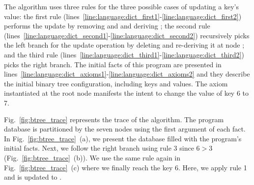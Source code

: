 The algorithm uses three rules for the three possible cases of updating a key's
value: the first rule
(lines~\ref{line:language:dict_first1}-\ref{line:language:dict_first2}) performs
the update by removing  and 
and deriving ; the second rule
(lines~\ref{line:language:dict_second1}-\ref{line:language:dict_second2})
recursively picks the left branch for the update operation by deleting
 and re-deriving it at node ; and the
third rule
(lines~\ref{line:language:dict_third1}-\ref{line:language:dict_third2}) picks
the right branch.
The initial facts of this program are presented in
lines~\ref{line:language:dict_axioms1}-\ref{line:language:dict_axioms2} and they
describe the initial binary tree configuration, including keys and values.  The
axiom  instantiated at the root node 
manifests the intent to change the value of key 6 to 7.

Fig.~\ref{fig:btree_trace} represents the trace of the algorithm. The program
database is partitioned by the seven nodes using the first argument of each
fact. In Fig.~\ref{fig:btree_trace}~(a), we present the database filled with the
program's initial facts. Next, we follow the right branch using rule 3 since $6
> 3$ (Fig.~\ref{fig:btree_trace}~(b)).  We use the same rule again in
Fig.~\ref{fig:btree_trace}~(c) where we finally reach the key 6. Here, we apply
rule 1 and  is updated to .

